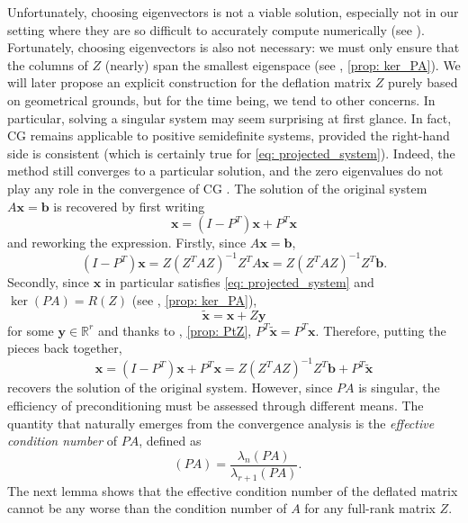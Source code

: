 \documentclass{article}
\numberwithin{equation}{section}
\DeclareMathOperator{\keff}{\kappa_{\operatorname{eff}}}
\theoremstyle{definition}
\begin{document}
Unfortunately, choosing eigenvectors is not a viable solution, especially not in our setting where they are so difficult to accurately compute numerically (see ). Fortunately, choosing eigenvectors is also not necessary: we must only ensure that the columns of $Z$ (nearly) span the smallest eigenspace (see , \ref{prop: ker_PA}). We will later propose an explicit construction for the deflation matrix $Z$ purely based on geometrical grounds, but for the time being, we tend to other concerns. In particular, solving a singular system may seem surprising at first glance. In fact, CG remains applicable to positive semidefinite systems, provided the right-hand side is consistent (which is certainly true for \eqref{eq: projected_system}). Indeed, the method still converges to a particular solution, and the zero eigenvalues do not play any role in the convergence of CG \cite{kaasschieter1988preconditioned}. The solution of the original system $A\bm{x}=\bm{b}$ is recovered by first writing
\begin{equation*}
    \bm{x} = (I-P^T)\bm{x} + P^T\bm{x}
\end{equation*}
and reworking the expression. Firstly, since $A\bm{x}=\bm{b}$,
\begin{equation*}
    (I-P^T)\bm{x} = Z(Z^TAZ)^{-1}Z^TA\bm{x} = Z(Z^TAZ)^{-1}Z^T\bm{b}.
\end{equation*}
Secondly, since $\bm{x}$ in particular satisfies \eqref{eq: projected_system} and $\ker(PA)=R(Z)$ (see , \ref{prop: ker_PA}),
\begin{equation*}
    \tilde{\bm{x}} = \bm{x} + Z\bm{y}
\end{equation*}
for some $\bm{y} \in \mathbb{R}^r$ and thanks to , \ref{prop: PtZ}, $P^T\tilde{\bm{x}}=P^T\bm{x}$. Therefore, putting the pieces back together,
\begin{equation}
\label{eq: solution}
    \bm{x}= (I-P^T)\bm{x} + P^T\bm{x} = Z(Z^TAZ)^{-1}Z^T\bm{b} + P^T\tilde{\bm{x}}
\end{equation}
recovers the solution of the original system. However, since $PA$ is singular, the efficiency of preconditioning must be assessed through different means. The quantity that naturally emerges from the convergence analysis is the \emph{effective condition number} of $PA$, defined as
\begin{equation*}
    \keff(PA) = \frac{\lambda_n(PA)}{\lambda_{r+1}(PA)}.
\end{equation*}
The next lemma shows that the effective condition number of the deflated matrix cannot be any worse than the condition number of $A$ for any full-rank matrix $Z$.
\end{document}
